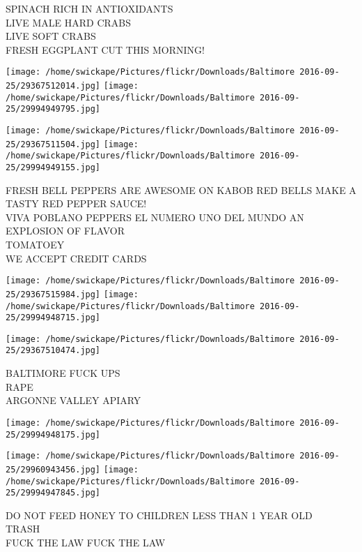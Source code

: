 \documentclass[10pt,letterpaper]{article}
\begin{document}
SPINACH RICH IN ANTIOXIDANTS\\
LIVE MALE HARD CRABS\\
LIVE SOFT CRABS\\
FRESH EGGPLANT CUT THIS MORNING!\\
\pagebreak

\texttt{[image: /home/swickape/Pictures/flickr/Downloads/Baltimore 2016-09-25/29367512014.jpg]}
\texttt{[image: /home/swickape/Pictures/flickr/Downloads/Baltimore 2016-09-25/29994949795.jpg]}

\texttt{[image: /home/swickape/Pictures/flickr/Downloads/Baltimore 2016-09-25/29367511504.jpg]}
\texttt{[image: /home/swickape/Pictures/flickr/Downloads/Baltimore 2016-09-25/29994949155.jpg]}

FRESH BELL PEPPERS ARE AWESOME ON KABOB RED BELLS MAKE A TASTY RED PEPPER SAUCE!\\
VIVA POBLANO PEPPERS EL NUMERO UNO DEL MUNDO AN EXPLOSION OF FLAVOR\\
TOMATOEY\\
WE ACCEPT CREDIT CARDS\\
\pagebreak

\texttt{[image: /home/swickape/Pictures/flickr/Downloads/Baltimore 2016-09-25/29367515984.jpg]}
\texttt{[image: /home/swickape/Pictures/flickr/Downloads/Baltimore 2016-09-25/29994948715.jpg]}

\texttt{[image: /home/swickape/Pictures/flickr/Downloads/Baltimore 2016-09-25/29367510474.jpg]}

BALTIMORE FUCK UPS\\
RAPE\\
ARGONNE VALLEY APIARY\\
\pagebreak

\texttt{[image: /home/swickape/Pictures/flickr/Downloads/Baltimore 2016-09-25/29994948175.jpg]}

\vspace{0.25in}
\texttt{[image: /home/swickape/Pictures/flickr/Downloads/Baltimore 2016-09-25/29960943456.jpg]}
\texttt{[image: /home/swickape/Pictures/flickr/Downloads/Baltimore 2016-09-25/29994947845.jpg]}

DO NOT FEED HONEY TO CHILDREN LESS THAN 1 YEAR OLD\\
TRASH\\
FUCK THE LAW FUCK THE LAW\\
\pagebreak
\end{document}
